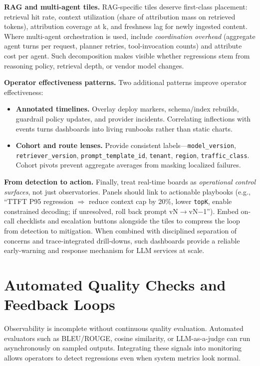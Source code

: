 \medskip
\noindent\textbf{RAG and multi-agent tiles.}
RAG-specific tiles deserve first-class placement: retrieval hit rate, context utilization (share of attribution mass on retrieved tokens), attribution coverage at k, and freshness lag for newly ingested content. Where multi-agent orchestration is used, include \emph{coordination overhead} (aggregate agent turns per request, planner retries, tool-invocation counts) and attribute cost per agent. Such decomposition makes visible whether regressions stem from reasoning policy, retrieval depth, or vendor model changes.

\medskip
\noindent\textbf{Operator effectiveness patterns.}
Two additional patterns improve operator effectiveness:
\begin{itemize}
\item \textbf{Annotated timelines.} Overlay deploy markers, schema/index rebuilds, guardrail policy updates, and provider incidents. Correlating inflections with events turns dashboards into living runbooks rather than static charts.
\item \textbf{Cohort and route lenses.} Provide consistent labels—\texttt{model\_version}, \texttt{retriever\_version}, \texttt{prompt\_template\_id}, \texttt{tenant}, \texttt{region}, \texttt{traffic\_class}. Cohort pivots prevent aggregate averages from masking localized failures.
\end{itemize}

\medskip
\noindent\textbf{From detection to action.}
Finally, treat real-time boards as \emph{operational control surfaces}, not just observatories. Panels should link to actionable playbooks (e.g., “TTFT P95 regression $\Rightarrow$ reduce context cap by 20\%, lower \texttt{topK}, enable constrained decoding; if unresolved, roll back prompt vN$\rightarrow$vN$-$1”). Embed on-call checklists and escalation buttons alongside the tiles to compress the loop from detection to mitigation. When combined with disciplined separation of concerns and trace-integrated drill-downs, such dashboards provide a reliable early-warning and response mechanism for LLM services at scale.

\section{Automated Quality Checks and Feedback Loops}
\label{sec:automated-quality-checks-and-feedback-loops}
Observability is incomplete without continuous quality evaluation. Automated evaluators such as BLEU/ROUGE, cosine similarity, or LLM-as-a-judge \cite{zheng2023judge} can run asynchronously on sampled outputs. Integrating these signals into monitoring allows operators to detect regressions even when system metrics look normal.

